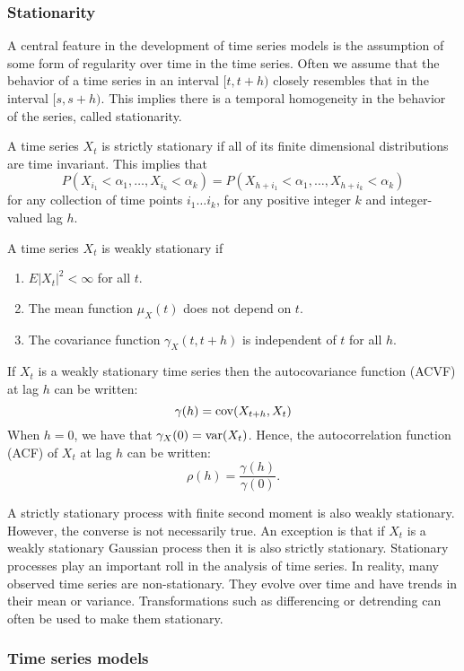 \subsubsection{Stationarity}
A central feature in the development of time series models is the assumption of some form of regularity over time in the time series. Often we assume that the behavior of a time series in an interval $[t, t+h)$ closely resembles that in the interval $[s, s+h).$  This implies there is a temporal homogeneity in the behavior of the series, called stationarity.

A time series $X_t$ is strictly stationary if all of its finite dimensional distributions are time invariant. 
This implies that
$$
P(X_{i_1} < \alpha_1, \ldots , X_{i_k} < \alpha_k) = P(X_{h+i_1} < \alpha_1, \ldots , X_{h+i_k} < \alpha_k)  
$$	 
for any collection of time points $i_1\ldots i_k$, for any positive integer $k$ and integer-valued lag $h$.

A time series $X_t$ is weakly stationary if 
\begin{enumerate}
\item $E|X_t|^2 < \infty$ for all $t$.
\item The mean function $\mu_X(t)$ does not depend on $t$.
\item The covariance function $\gamma_X(t, t+h)$ is independent of $t$ for all $h$. 
\end{enumerate}
If $X_t$ is a weakly stationary time series then the autocovariance function (ACVF) at lag $h$ can be written: 
$$
\gamma(h) = \mathrm{cov}(X_{t+h},X_t) 
$$
When $h=0$, we have that $\gamma_X(0) = \mathrm{var}(X_t)$. Hence, the autocorrelation function (ACF) of $X_t$ at lag $h$ can be written:
 $$
 \rho(h) = \frac{\gamma(h)}{\gamma(0)}.
 $$


A strictly stationary process with finite second moment is also weakly stationary.
However, the converse is not necessarily true.
An exception is that if $X_t$ is a weakly stationary Gaussian process then it is also strictly stationary.
Stationary processes play an important roll in the analysis of time series.
In reality, many observed time series are non-stationary.
They evolve over time and have trends in their mean or variance. 
Transformations such as differencing or detrending can often be used to make them stationary. 


\subsubsection{Time series models}

